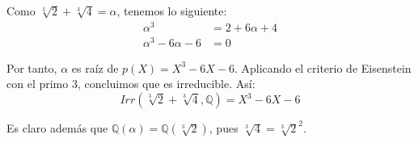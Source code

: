 \documentclass[a4paper, 11pt]{article}
\begin{document}
\begin{solucion}
\begin{apartado}
          Como $\sqrt[3]{2} + \sqrt[3]{4} = \alpha$, tenemos lo siguiente:
          \begin{align*}
              \alpha^3 &= 2 + 6\alpha + 4 \\
              \alpha^3 - 6\alpha - 6 &= 0
          \end{align*}

          Por tanto, $\alpha$ es raíz de $p(X) = X^3-6X-6$. Aplicando el criterio de Eisenstein con el primo 3, concluimos que es irreducible. Así:
          \[
          Irr(\sqrt[3]{2} + \sqrt[3]{4},\mathbb{Q}) = X^3-6X-6
          \]

          Es claro además que $\mathbb{Q}(\alpha) = \mathbb{Q}(\sqrt[3]{2})$, pues $\sqrt[3]{4} = \sqrt[3]{2} ^ 2$.
      \end{apartado}
  \end{solucion}
\end{document}
